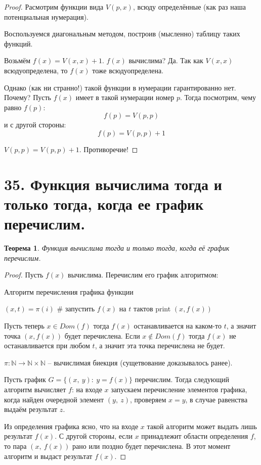 \documentclass[a4paper, 12pt]{article}
\newtheorem*{theorem}{Теорема}
\newcommand{\N}{\mathbb{N}}
\begin{document}
\begin{proof}
    Расмотрим функции вида $V(p,x)$, всюду определённые
    (как раз наша потенциальная нумерация).
    
    Воспользуемся диагональным методом, построив (мысленно) таблицу таких функций.
    
    Возьмём $f(x) = V(x,x) + 1$. $f(x)$ вычислима? Да.
    Так как $V(x, x)$ всюдуопределена, то $f(x)$ тоже
    всюдуопределена.
    
    Однако (как ни странно!) такой функции в нумерации гарантированно нет. Почему? Пусть $f(x)$ имеет
    в такой нумерации номер $p$. Тогда посмотрим,
    чему равно $f(p)$:
    \[
    f(p) = V(p, p)
    \]
    и с другой стороны:
    \[
    f(p) = V(p, p) + 1
    \]
    
    $V(p, p) = V(p, p) + 1$. Противоречие!
\end{proof}

\section*{35. Функция вычислима тогда и только тогда, когда ее график перечислим.}

\begin{theorem}
    Функция вычислима тогда и только тогда, когда её график перечислим.
\end{theorem}

\begin{proof}
Пусть $f(x)$ вычислима. Перечислим его график алгоритмом:
\begin{algorithm}
        \caption{Алгоритм перечисления графика функции}
        \label{algo:35_task_proof}
        \begin{algorithmic}
                \State $(x, t) = \pi(i)$
                \State \# запустить $f(x)$ на $t$ тактов
                    \State print $(x, f(x))$
                \EndIf
                \EndFor
            \EndFunction
        \end{algorithmic}
\end{algorithm}

Пусть теперь $x \in Dom(f)$ тогда $f(x)$ останавливается
на каком-то $t$, а значит точка $(x, f(x))$ будет перечислена. Если $x \notin Dom(f)$ тогда $f(x)$ не
останавливается при любом $t$, а значит эта точка
перечислена не будет. 

$\pi: \N \to \N \times \N$ -- вычислимая биекция (сущетвование доказывалось ранее).

Пусть график $G = \{(x,\ y) :\ y = f(x)\}$ перечислим. Тогда следующий алгоритм
вычисляет $f$: на входе $x$ запускаем перечисление элементов графика, когда найден очередной элемент $(y,\ z)$, проверяем $x = y$, в случае равенства выдаём результат $z$.

Из определения графика ясно, что на входе $x$ такой алгоритм может выдать
лишь результат $f(x)$. С другой стороны, если $x$ принадлежит области определения $f$, то пара $(x,\ f(x))$ рано или поздно будет перечислена. В этот момент алгоритм и выдаст результат $f(x)$.

\end{proof}
\end{document}
